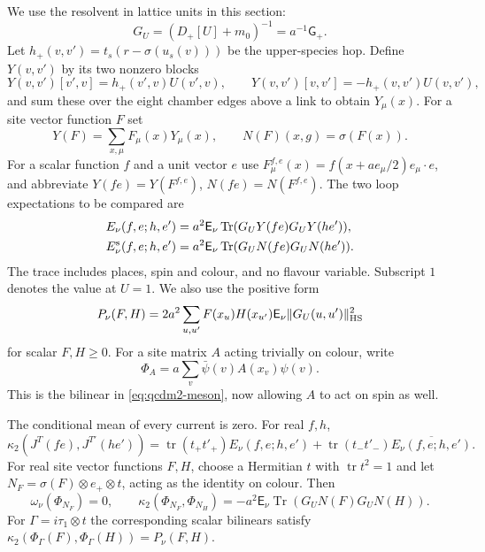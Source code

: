 \documentclass[11pt,letterpaper,reqno]{amsart}
\makeatletter
\theoremstyle{definition}
\newcommand{\ms@minorstart}{%
  \pushQED{\qed}\renewcommand{\qedsymbol}{$\blacksquare$}}
\newenvironment{lemma}[1][]{\ms@minorstart\ms@lemma[#1]}
  {\popQED\endms@lemma}
\theoremstyle{remark}
\makeatother
\begin{document}
We use the resolvent in lattice units in this section:
\[
 G_U=(D_+[U]+m_0)^{-1}=a^{-1}\mathsf G_+.
\]
Let $h_+(v,v')=t_s(r-\sigma(u_s(v)))$ be the upper-species
hop.  Define $Y(v,v')$ by its two nonzero blocks
\[
 Y(v,v')[v',v]=h_+(v',v)U(v',v),\qquad
 Y(v,v')[v,v']=-h_+(v,v')U(v,v'),
\]
and sum these over the eight chamber edges above a link to obtain
$Y_\mu(x)$.  For a site vector function $F$ set
\[
 Y(F)=\sum_{x,\mu}F_\mu(x)Y_\mu(x),\qquad
 N(F)(x,g)=\sigma(F(x)).
\]
For a scalar function $f$ and a unit vector $e$ use
$F^{f,e}_\mu(x)=f(x+ae_\mu/2)e_\mu\cdot e$, and abbreviate
$Y(fe)=Y(F^{f,e})$, $N(fe)=N(F^{f,e})$.
The two loop expectations to be compared are
\begin{equation}\label{C-417-2}
 \begin{split}
 E_\nu(f,e;h,e')&=a^2\mathsf E_\nu
                \operatorname{Tr}(G_UY(fe)G_UY(he')),\\
 E_\nu^{\rm s}(f,e;h,e')&=a^2\mathsf E_\nu
                \operatorname{Tr}(G_UN(fe)G_UN(he')).
 \end{split}
\end{equation}
The trace includes places, spin and colour, and no flavour
variable.  Subscript $1$ denotes the value at $U=1$.
We also use the positive form
\begin{equation}\label{eq:qcdm2-positive-propagator}
 P_\nu(F,H)=2a^2\sum_{u,u'}F(x_u)H(x_{u'})
                 \mathsf E_\nu\|G_U(u,u')\|_{\rm HS}^2
\end{equation}
for scalar $F,H\ge0$.
For a site matrix $A$ acting trivially on colour, write
\[
 \Phi_A=a\sum_v\bar\psi(v)A(x_v)\psi(v).
\]
This is the bilinear in \eqref{eq:qcdm2-meson},
now allowing $A$ to act on spin as well.

\begin{lemma}\label{C-417-3}\label{C-402-24}
The conditional mean of every current is zero.  For real $f,h$,
\begin{equation}\label{eq:qcdm2-current-loop}
 \kappa_2(J^T(fe),J^{T'}(he'))
 =\operatorname{tr}(t_+t'_+)E_\nu(f,e;h,e')
       +\operatorname{tr}(t_-t'_-)\overline{E_\nu(f,e;h,e')}.
\end{equation}
For real site vector functions $F,H$, choose a Hermitian $t$
with $\operatorname{tr}t^2=1$ and let
$N_F=\sigma(F)\otimes e_+\otimes t$, acting as the identity
on colour.  Then
\[
 \omega_\nu(\Phi_{N_F})=0,\qquad
 \kappa_2(\Phi_{N_F},\Phi_{N_H})
             =-a^2\mathsf E_\nu\operatorname{Tr}(G_UN(F)G_UN(H)).
\]
For $\Gamma=i\tau_1\otimes t$ the corresponding scalar
bilinears satisfy
$\kappa_2(\Phi_\Gamma(F),\Phi_\Gamma(H))=P_\nu(F,H)$.
\end{lemma}
\end{document}
